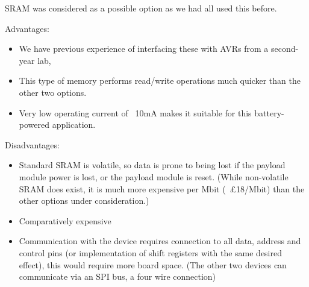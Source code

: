 SRAM was considered as a possible option as we had all used this before.

Advantages:
\begin{itemize}
\item We have previous experience of interfacing these with AVRs from a 
second-year lab, 
\item This type of memory performs read/write operations much quicker than 
the other two options.
\item Very low operating current of ~10mA makes it suitable for this battery-powered application.
\end{itemize}

Disadvantages:
\begin{itemize}
\item Standard SRAM is volatile, so data is prone to being lost if the payload 
module power is lost, or the payload module is reset. (While non-volatile SRAM 
does exist, it is much more expensive per Mbit (~£18/Mbit) than the other 
options under consideration.)
\item Comparatively expensive
\item Communication with the device requires connection to all data, address 
and control pins (or implementation of shift registers with the same desired 
effect), this would require more board space. (The other two devices can 
communicate via an SPI bus, a four wire connection)
\end{itemize}